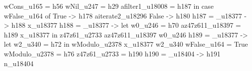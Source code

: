                                                                                                                                     wCons_u165 = h56
                                                                                                                                    wNil_u247 = h29
                                                                                                                                    afilter1_u18008 = h187
                                                                                                                                  in case wFalse_u164 of
                                                                                                                                       True ->
                                                                                                                                         h178 aiterate2_u18296
                                                                                                                                       False ->
                                                                                                                                         h180
                                                                                      h187 = \x_u18377 -> h188 x_u18377
                                                                                      h188 = \x_u18377 -> let
                                                                                                            w0_u246 = h70
                                                                                                            az47z611_u18397 = h189 x_u18377
                                                                                                          in z47z61_u2733 az47z611_u18397 w0_u246
                                                                                      h189 = \x_u18377 -> let
                                                                                                            w2_u340 = h72
                                                                                                          in wModulo_u2378 x_u18377 w2_u340
                                                                                      wFalse_u164 = True
                                                                                      wModulo_u2378 = h76
                                                                                      z47z61_u2733 = h190
                                                                                      h190 = \n_u18404 -> h191 n_u18404
